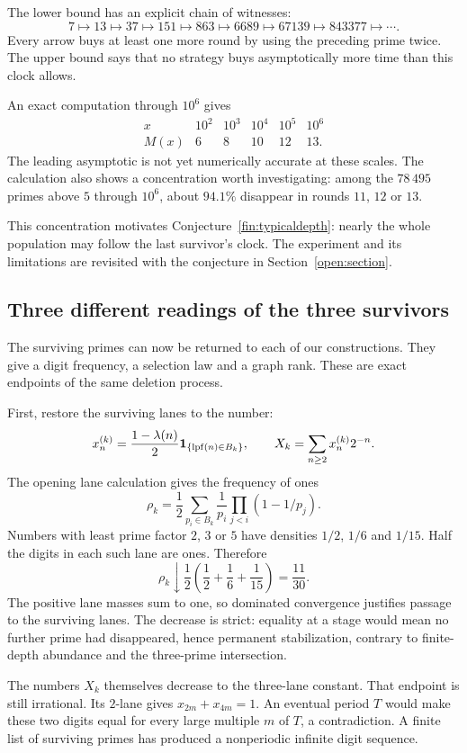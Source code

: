 The lower bound has an explicit chain of witnesses:
\[
 7\longmapsto13\longmapsto37\longmapsto151
 \longmapsto863\longmapsto6689\longmapsto67139
 \longmapsto843377\longmapsto\cdots.
\]
Every arrow buys at least one more round by using the preceding prime
twice.  The upper bound says that no strategy buys asymptotically more
time than this clock allows.

An exact computation through $10^6$ gives
\[
 \begin{array}{c|rrrrr}
 x&10^2&10^3&10^4&10^5&10^6\\ \hline
 M(x)&6&8&10&12&13.
 \end{array}
\]
The leading asymptotic is not yet numerically accurate at these scales.
The calculation also shows a concentration worth investigating:
among the $78\,495$ primes above $5$ through $10^6$, about $94.1\%$
disappear in rounds $11$, $12$ or $13$.

This concentration motivates Conjecture~\ref{fin:typicaldepth}:
nearly the whole population may follow the last survivor's clock.
The experiment and its limitations are revisited with the conjecture
in Section~\ref{open:section}.

\subsection{Three different readings of the three survivors}
The surviving primes can now be returned to each of our constructions.
They give a digit frequency, a selection law and a graph rank.
These are exact endpoints of the same deletion process.

First, restore the surviving lanes to the number:
\[
 x_n^{(k)}=\frac{1-\lambda(n)}2
               {\bf1}_{\{\operatorname{lpf}(n)\in B_k\}},\qquad
 X_k=\sum_{n\ge2}x_n^{(k)}2^{-n}.
\]
The opening lane calculation gives the frequency of ones
\[
 \rho_k=\frac12\sum_{p_i\in B_k}
                  \frac1{p_i}\prod_{j<i}(1-1/p_j).
\]
Numbers with least prime factor $2$, $3$ or $5$ have densities
$1/2$, $1/6$ and $1/15$.  Half the digits in each such lane are ones.
Therefore
\[
 \boxed{\rho_k\downarrow
     \frac12\left(\frac12+\frac16+\frac1{15}\right)=\frac{11}{30}.}
\]
The positive lane masses sum to one, so dominated convergence
justifies passage to the surviving lanes.
The decrease is strict: equality at a stage would mean no further
prime had disappeared, hence permanent stabilization, contrary to
finite-depth abundance and the three-prime intersection.

The numbers $X_k$ themselves decrease to the three-lane constant.
That endpoint is still irrational.
Its $2$-lane gives $x_{2m}+x_{4m}=1$.
An eventual period $T$ would make these two digits equal for every
large multiple $m$ of $T$, a contradiction.
A finite list of surviving primes has produced a nonperiodic
infinite digit sequence.

